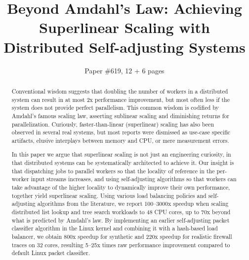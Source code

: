 \documentclass[letterpaper,twocolumn,10pt]{article}
\begin{document}


\title{Beyond Amdahl's Law: Achieving Superlinear Scaling with\\Distributed Self-adjusting Systems}

\author{Paper \#619, 12 + 6 pages}

\maketitle

\begin{abstract}
  Conventional wisdom suggests that doubling the number of workers in a distributed system can result in at most 2x performance improvement, but most often less if the system does not provide perfect parallelism.  This common wisdom is codified by Amdahl's famous scaling law, asserting sublinear scaling and diminishing returns for parallelization. Curiously, faster-than-linear (superlinear) scaling has also been observed in several real systems, but most reports were dismissed as use-case specific artifacts, elusive interplays between memory and CPU, or mere measurement errors.

  In this paper we argue that superlinear scaling is not just an engineering curiosity, in that distributed systems can be systematically architected to achieve it. Our insight is that dispatching jobs to parallel workers so that the locality of reference in the per-worker input streams increases, and using self-adjusting algorithms so that workers can take advantage of the higher locality to dynamically improve their own performance, together yield superlinear scaling. Using various load balancing policies and self-adjusting algorithms from the literature, we report 100--3000x speedup when scaling distributed list lookup and tree search workloads to 48 CPU cores, up to 70x beyond what is predicted by Amdahl's law. By implementing an earlier self-adjusting packet classifier algorithm in the Linux kernel and combining it with a hash-based load balancer, we obtain 800x speedup for synthetic and 220x speedup for realistic firewall traces on 32 cores, resulting 5--25x times raw performance improvement compared to default Linux packet classifier.
\end{abstract}
\end{document}
